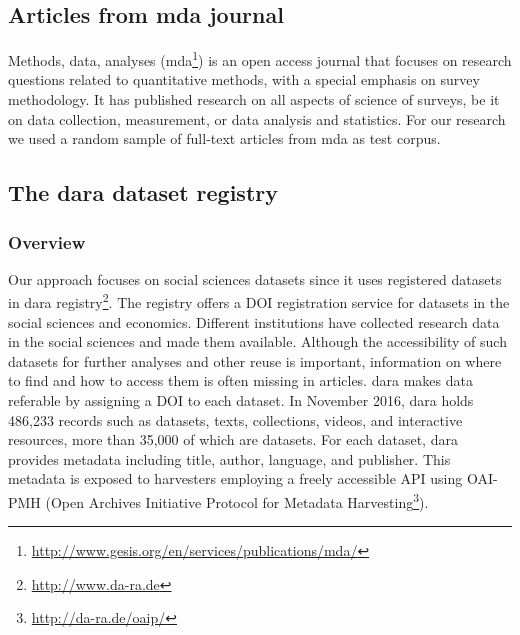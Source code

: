 \documentclass{IOS-Book-Article}
\newcommand{\dara}{\textsf{da\textbar ra}}
\begin{document}
\subsection{Articles from mda journal}\label{sec:mda}
 
Methods, data, analyses (mda\footnote{\url{http://www.gesis.org/en/services/publications/mda/}}) is an open access journal that focuses on research questions related to quantitative methods, with a special emphasis on survey methodology.
It has published research on all aspects of science of surveys, be it on data collection, measurement, or data analysis and statistics.
For our research we used a random sample of full-text articles from mda as test corpus.
 
\subsection{The {\dara} dataset registry}
  
\subsubsection{Overview}
Our approach focuses on social sciences datasets since it uses registered datasets in {\dara} registry\footnote{\url{http://www.da-ra.de}}.
The registry offers a DOI registration service for datasets in the social sciences and economics. 
Different institutions have collected research data in the social sciences and made them available.
Although the accessibility of such datasets for further analyses and other reuse is important, information on where to find and how to access them is often missing in articles.
{\dara} makes 
data referable 
by assigning a DOI to each dataset.
In November 2016, {\dara} holds 486,233 records such as datasets, texts, collections, videos, and interactive resources, more than 35,000 of which are datasets. 
For each dataset, {\dara} provides metadata including title, author, language, and publisher.
This metadata is exposed to harvesters employing a freely accessible API using OAI-PMH (Open Archives Initiative Protocol for Metadata Harvesting\footnote{\url{http://da-ra.de/oaip/}}). 
  
\end{document}

